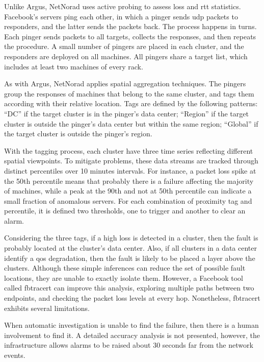 Unlike Argus, NetNorad uses active probing to assess loss and \gls*{rtt}
statistics.  Facebook's servers ping each other, in which
a pinger sends \gls*{udp} packets to responders, and the latter
sends the packets back. The process happens in turns. Each pinger
sends packets to all targets, collects the responses, and then repeats
the procedure. A small number of pingers are placed in each cluster,
and the responders are
deployed on all machines. All pingers share a target list, which includes
at least two machines of every rack.

As with Argus, NetNorad applies spatial aggregation techniques.
The pingers group the responses of machines that belong to the same cluster,
and tags them according with their relative location.
Tags are defined by the following patterns:
``DC'' if the target cluster is in the pinger's data center;
``Region'' if the target cluster is outside the pinger's
data center but within the same region;
``Global'' if the target cluster is outside the pinger's
region.

With the tagging process, each cluster have three time series reflecting
different spatial viewpoints.
To mitigate problems, these data streams are tracked through
distinct percentiles over 10 minutes intervals.
For instance, a packet loss spike at the
50th percentile means that probably there is a failure affecting the majority of
machines, while a peak at the 90th and not at 50th
percentile can indicate a small fraction of anomalous servers.
For each combination of proximity tag and percentile, it is defined two
thresholds, one to trigger and another to clear an alarm.

Considering the three tags, if a high loss is detected in a cluster,
then the fault is probably located at the cluster's data center.
Also, if all clusters in a data center identify a \gls*{qos} degradation,
then the fault is likely to be placed a layer above the clusters.
Although these simple inferences can reduce the set of possible fault locations,
they are unable to exactly isolate them.
However, a Facebook tool called fbtracert
can improve this analysis, exploring multiple
paths between two endpoints, and checking the
packet loss levels at every hop. Nonetheless, fbtracert exhibits several
limitations.

When automatic investigation is unable to find the failure, then there
is a human involvement to find it. A detailed accuracy analysis is not
presented, however, the infrastructure allows alarms to be raised about 30
seconds far from the network events.

